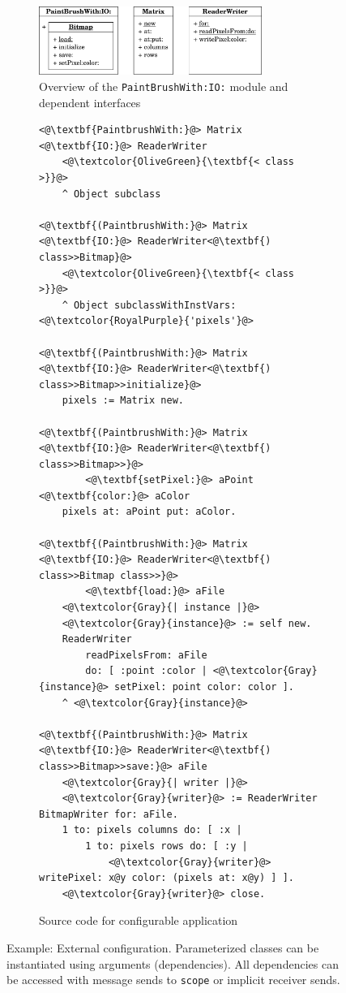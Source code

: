 \begin{figure}[!htp]
\begin{subfigure}[b]{\textwidth}
\centering
\includegraphics[width=0.8\textwidth]{usecase_paintbrush.pdf}
\caption{Overview of the \texttt{PaintBrushWith:IO:} module and dependent interfaces}
\end{subfigure}

\vspace{10pt}

\begin{subfigure}[b]{\textwidth}
\begin{lstlisting}
<@\textbf{PaintbrushWith:}@> Matrix <@\textbf{IO:}@> ReaderWriter
    <@\textcolor{OliveGreen}{\textbf{< class >}}@>
    ^ Object subclass

<@\textbf{(PaintbrushWith:}@> Matrix <@\textbf{IO:}@> ReaderWriter<@\textbf{) class>>Bitmap}@>
    <@\textcolor{OliveGreen}{\textbf{< class >}}@>
    ^ Object subclassWithInstVars: <@\textcolor{RoyalPurple}{'pixels'}@>

<@\textbf{(PaintbrushWith:}@> Matrix <@\textbf{IO:}@> ReaderWriter<@\textbf{) class>>Bitmap>>initialize}@>
    pixels := Matrix new.

<@\textbf{(PaintbrushWith:}@> Matrix <@\textbf{IO:}@> ReaderWriter<@\textbf{) class>>Bitmap>>}@>
        <@\textbf{setPixel:}@> aPoint <@\textbf{color:}@> aColor
    pixels at: aPoint put: aColor.

<@\textbf{(PaintbrushWith:}@> Matrix <@\textbf{IO:}@> ReaderWriter<@\textbf{) class>>Bitmap class>>}@>
        <@\textbf{load:}@> aFile
    <@\textcolor{Gray}{| instance |}@>
    <@\textcolor{Gray}{instance}@> := self new.
    ReaderWriter 
        readPixelsFrom: aFile
        do: [ :point :color | <@\textcolor{Gray}{instance}@> setPixel: point color: color ].
    ^ <@\textcolor{Gray}{instance}@>

<@\textbf{(PaintbrushWith:}@> Matrix <@\textbf{IO:}@> ReaderWriter<@\textbf{) class>>Bitmap>>save:}@> aFile
    <@\textcolor{Gray}{| writer |}@>
    <@\textcolor{Gray}{writer}@> := ReaderWriter BitmapWriter for: aFile.
    1 to: pixels columns do: [ :x |
        1 to: pixels rows do: [ :y | 
            <@\textcolor{Gray}{writer}@> writePixel: x@y color: (pixels at: x@y) ] ].
    <@\textcolor{Gray}{writer}@> close.
\end{lstlisting}
\caption{Source code for configurable application}
\end{subfigure}
\caption[Example: External configuration]{Example: External configuration. Parameterized classes can be instantiated using arguments (dependencies). All dependencies can be accessed with message sends to \texttt{scope} or implicit receiver sends.}
\label{fig:use_paintbrush}
\end{figure}

